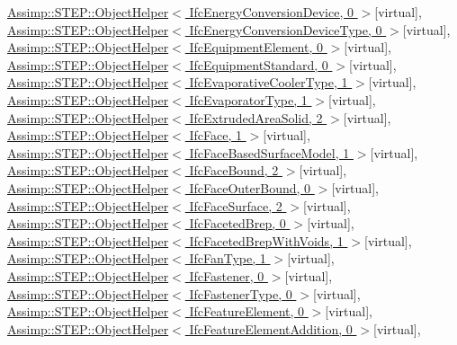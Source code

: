 \hyperlink{struct_assimp_1_1_s_t_e_p_1_1_object_helper}{Assimp\+::\+S\+T\+E\+P\+::\+Object\+Helper$<$ Ifc\+Energy\+Conversion\+Device, 0 $>$}{\ttfamily  \mbox{[}virtual\mbox{]}}, \hyperlink{struct_assimp_1_1_s_t_e_p_1_1_object_helper}{Assimp\+::\+S\+T\+E\+P\+::\+Object\+Helper$<$ Ifc\+Energy\+Conversion\+Device\+Type, 0 $>$}{\ttfamily  \mbox{[}virtual\mbox{]}}, \hyperlink{struct_assimp_1_1_s_t_e_p_1_1_object_helper}{Assimp\+::\+S\+T\+E\+P\+::\+Object\+Helper$<$ Ifc\+Equipment\+Element, 0 $>$}{\ttfamily  \mbox{[}virtual\mbox{]}}, \hyperlink{struct_assimp_1_1_s_t_e_p_1_1_object_helper}{Assimp\+::\+S\+T\+E\+P\+::\+Object\+Helper$<$ Ifc\+Equipment\+Standard, 0 $>$}{\ttfamily  \mbox{[}virtual\mbox{]}}, \hyperlink{struct_assimp_1_1_s_t_e_p_1_1_object_helper}{Assimp\+::\+S\+T\+E\+P\+::\+Object\+Helper$<$ Ifc\+Evaporative\+Cooler\+Type, 1 $>$}{\ttfamily  \mbox{[}virtual\mbox{]}}, \hyperlink{struct_assimp_1_1_s_t_e_p_1_1_object_helper}{Assimp\+::\+S\+T\+E\+P\+::\+Object\+Helper$<$ Ifc\+Evaporator\+Type, 1 $>$}{\ttfamily  \mbox{[}virtual\mbox{]}}, \hyperlink{struct_assimp_1_1_s_t_e_p_1_1_object_helper}{Assimp\+::\+S\+T\+E\+P\+::\+Object\+Helper$<$ Ifc\+Extruded\+Area\+Solid, 2 $>$}{\ttfamily  \mbox{[}virtual\mbox{]}}, \hyperlink{struct_assimp_1_1_s_t_e_p_1_1_object_helper}{Assimp\+::\+S\+T\+E\+P\+::\+Object\+Helper$<$ Ifc\+Face, 1 $>$}{\ttfamily  \mbox{[}virtual\mbox{]}}, \hyperlink{struct_assimp_1_1_s_t_e_p_1_1_object_helper}{Assimp\+::\+S\+T\+E\+P\+::\+Object\+Helper$<$ Ifc\+Face\+Based\+Surface\+Model, 1 $>$}{\ttfamily  \mbox{[}virtual\mbox{]}}, \hyperlink{struct_assimp_1_1_s_t_e_p_1_1_object_helper}{Assimp\+::\+S\+T\+E\+P\+::\+Object\+Helper$<$ Ifc\+Face\+Bound, 2 $>$}{\ttfamily  \mbox{[}virtual\mbox{]}}, \hyperlink{struct_assimp_1_1_s_t_e_p_1_1_object_helper}{Assimp\+::\+S\+T\+E\+P\+::\+Object\+Helper$<$ Ifc\+Face\+Outer\+Bound, 0 $>$}{\ttfamily  \mbox{[}virtual\mbox{]}}, \hyperlink{struct_assimp_1_1_s_t_e_p_1_1_object_helper}{Assimp\+::\+S\+T\+E\+P\+::\+Object\+Helper$<$ Ifc\+Face\+Surface, 2 $>$}{\ttfamily  \mbox{[}virtual\mbox{]}}, \hyperlink{struct_assimp_1_1_s_t_e_p_1_1_object_helper}{Assimp\+::\+S\+T\+E\+P\+::\+Object\+Helper$<$ Ifc\+Faceted\+Brep, 0 $>$}{\ttfamily  \mbox{[}virtual\mbox{]}}, \hyperlink{struct_assimp_1_1_s_t_e_p_1_1_object_helper}{Assimp\+::\+S\+T\+E\+P\+::\+Object\+Helper$<$ Ifc\+Faceted\+Brep\+With\+Voids, 1 $>$}{\ttfamily  \mbox{[}virtual\mbox{]}}, \hyperlink{struct_assimp_1_1_s_t_e_p_1_1_object_helper}{Assimp\+::\+S\+T\+E\+P\+::\+Object\+Helper$<$ Ifc\+Fan\+Type, 1 $>$}{\ttfamily  \mbox{[}virtual\mbox{]}}, \hyperlink{struct_assimp_1_1_s_t_e_p_1_1_object_helper}{Assimp\+::\+S\+T\+E\+P\+::\+Object\+Helper$<$ Ifc\+Fastener, 0 $>$}{\ttfamily  \mbox{[}virtual\mbox{]}}, \hyperlink{struct_assimp_1_1_s_t_e_p_1_1_object_helper}{Assimp\+::\+S\+T\+E\+P\+::\+Object\+Helper$<$ Ifc\+Fastener\+Type, 0 $>$}{\ttfamily  \mbox{[}virtual\mbox{]}}, \hyperlink{struct_assimp_1_1_s_t_e_p_1_1_object_helper}{Assimp\+::\+S\+T\+E\+P\+::\+Object\+Helper$<$ Ifc\+Feature\+Element, 0 $>$}{\ttfamily  \mbox{[}virtual\mbox{]}}, \hyperlink{struct_assimp_1_1_s_t_e_p_1_1_object_helper}{Assimp\+::\+S\+T\+E\+P\+::\+Object\+Helper$<$ Ifc\+Feature\+Element\+Addition, 0 $>$}{\ttfamily  \mbox{[}virtual\mbox{]}}, 
